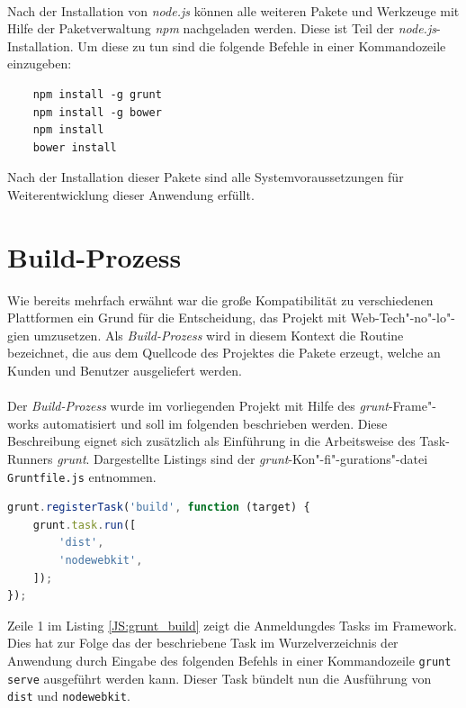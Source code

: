 \paragraph{}
Nach der Installation von \textit{node.js} können alle weiteren Pakete und Werkzeuge mit Hilfe der Paketverwaltung \textit{npm} nachgeladen werden.
Diese ist Teil der \textit{node.js}-Installation. Um diese zu tun sind die folgende Befehle in einer Kommandozeile einzugeben:
\begin{lstlisting}
	npm install -g grunt
	npm install -g bower
	npm install
	bower install
\end{lstlisting}

Nach der Installation dieser Pakete sind alle Systemvoraussetzungen für Weiterentwicklung dieser Anwendung erfüllt.

\section{Build-Prozess}
Wie bereits mehrfach erwähnt war die große Kompatibilität zu verschiedenen Plattformen ein Grund für die Entscheidung, das Projekt mit Web-Tech"-no"-lo"-gien umzusetzen.
Als \textit{Build-Prozess} wird in diesem Kontext die Routine bezeichnet, die aus dem Quellcode des Projektes die Pakete erzeugt, welche an Kunden und Benutzer ausgeliefert werden.

\paragraph{}
Der \textit{Build-Prozess} wurde im vorliegenden Projekt mit Hilfe des \textit{grunt}-Frame"-works automatisiert und soll im folgenden beschrieben werden.
Diese Beschreibung eignet sich zusätzlich als Einführung in die Arbeitsweise des \glqq Task-Runners \grqq \textit{grunt}. Dargestellte Listings sind der \textit{grunt}-Kon"-fi"-gurations"-datei \\\texttt{Gruntfile.js} entnommen.

\begin{lstlisting}[language=JavaScript,label=JS:grunt_build,caption=grunt build-Task]
grunt.registerTask('build', function (target) {
	grunt.task.run([
		'dist',
		'nodewebkit',
	]);
});
\end{lstlisting}

Zeile 1 im Listing \ref{JS:grunt_build} zeigt die \glqq Anmeldung\grqq des Tasks im Framework.
Dies hat zur Folge das der beschriebene Task im Wurzelverzeichnis der Anwendung durch Eingabe des folgenden Befehls in einer Kommandozeile \texttt{grunt serve} ausgeführt werden kann.
Dieser Task bündelt nun die Ausführung von \texttt{dist} und \texttt{nodewebkit}.


